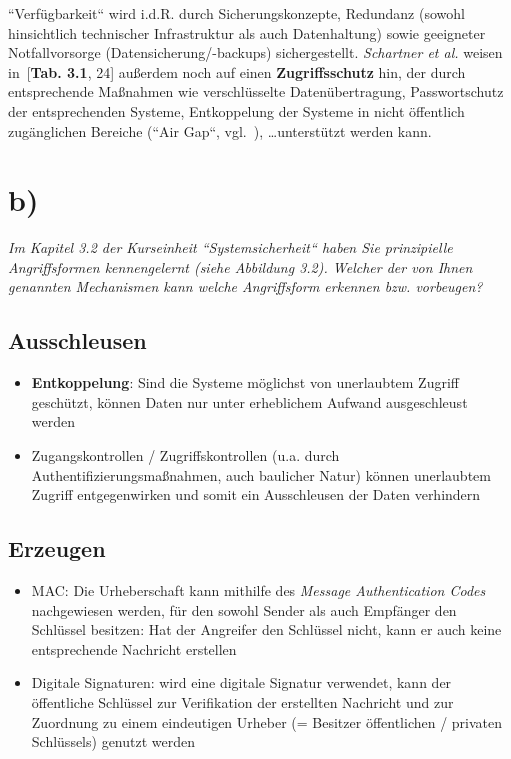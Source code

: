 \noindent
``Verfügbarkeit`` wird i.d.R. durch Sicherungskonzepte, Redundanz (sowohl hinsichtlich technischer Infrastruktur als auch Datenhaltung) sowie geeigneter Notfallvorsorge (Datensicherung/-backups) sichergestellt.
\textit{Schartner et al.} weisen in~\cite{HKRS+14}[\textbf{Tab. 3.1}, 24] außerdem noch auf einen \textbf{Zugriffsschutz} hin, der durch entsprechende Maßnahmen wie verschlüsselte Datenübertragung, Passwortschutz der entsprechenden Systeme, Entkoppelung der Systeme in nicht öffentlich zugänglichen Bereiche (``Air Gap``, vgl.~\cite{RFC4949}), \ldots unterstützt werden kann.

\section{b)}

\noindent
\textit{Im Kapitel 3.2 der Kurseinheit ``Systemsicherheit`` haben Sie prinzipielle Angriffsformen kennengelernt (siehe Abbildung 3.2).
Welcher der von Ihnen genannten Mechanismen kann welche Angriffsform erkennen bzw. vorbeugen?
}

\subsection*{Ausschleusen}
\begin{itemize}
    \itemsep0.5em
    \item \textbf{Entkoppelung}: Sind die Systeme möglichst von unerlaubtem Zugriff geschützt, können Daten nur unter erheblichem Aufwand ausgeschleust werden
    \item Zugangskontrollen / Zugriffskontrollen (u.a. durch Authentifizierungsmaßnahmen, auch baulicher Natur) können unerlaubtem Zugriff entgegenwirken und somit ein Ausschleusen der Daten verhindern
\end{itemize}

\subsection*{Erzeugen}
\begin{itemize}
    \itemsep0.5em
    \item {MAC}: Die Urheberschaft kann mithilfe des \textit{Message Authentication Codes} nachgewiesen werden, für den sowohl Sender als auch Empfänger den Schlüssel besitzen: Hat der Angreifer den Schlüssel nicht, kann er auch keine entsprechende Nachricht erstellen
    \item {Digitale Signaturen}: wird eine digitale Signatur verwendet, kann der öffentliche Schlüssel zur Verifikation der erstellten Nachricht und zur Zuordnung zu einem eindeutigen Urheber (= Besitzer öffentlichen / privaten Schlüssels) genutzt werden
\end{itemize}


